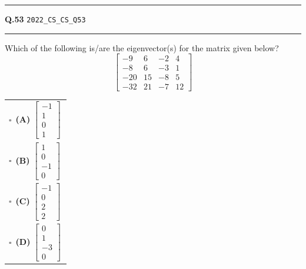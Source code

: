\documentclass[a4paper,10pt]{article}
\begin{document}
\vspace{6pt}\hrule height 0.35pt\vspace{6pt}
\noindent
\begin{tcolorbox}[
    blanker,
    sidebyside,
    sidebyside align=top,
    lefthand width=0.55\textwidth,
    top=4pt, bottom=4pt, left=0pt, right=0pt,
    middle=16pt,
    underlay={
        \draw[dashed, black!80, line width=0.8pt, dash pattern=on 4pt off 3pt]
            ([xshift=0.55\textwidth+8pt]frame.north west) --
            ([xshift=0.55\textwidth+8pt]frame.south west);
    }
]
\textbf{Q.53}  \hfill {\tiny\texttt{2022\_CS\_CS\_Q53}}
\vspace{2pt}\hrule height 0.3pt\vspace{4pt}

Which of the following is/are the eigenvector(s) for the matrix given below?
\[ \begin{bmatrix} -9 & 6 & -2 & 4 \\ -8 & 6 & -3 & 1 \\ -20 & 15 & -8 & 5 \\ -32 & 21 & -7 & 12 \end{bmatrix} \]

\par\vspace{6pt}\noindent
\begin{tabular}{@{}p{0.98\linewidth}@{}}
$\square$\ \textbf{(A)} $\begin{bmatrix} -1 \\ 1 \\ 0 \\ 1 \end{bmatrix}$ \\
\addlinespace[3pt]
$\square$\ \textbf{(B)} $\begin{bmatrix} 1 \\ 0 \\ -1 \\ 0 \end{bmatrix}$ \\
\addlinespace[3pt]
$\square$\ \textbf{(C)} $\begin{bmatrix} -1 \\ 0 \\ 2 \\ 2 \end{bmatrix}$ \\
\addlinespace[3pt]
$\square$\ \textbf{(D)} $\begin{bmatrix} 0 \\ 1 \\ -3 \\ 0 \end{bmatrix}$
\end{tabular}


\end{tcolorbox}
\end{document}
